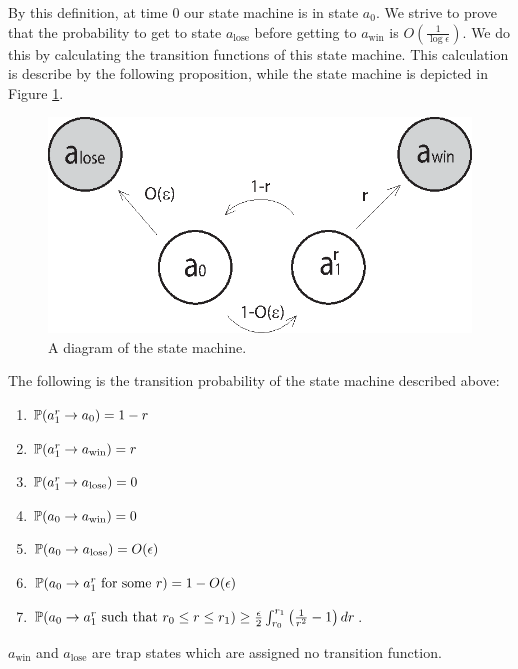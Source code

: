 {{By this definition, at time $0$ our state machine is in state $a_0$.
We strive to prove that the probability to get to
 state $a_\text{lose}$ before getting to $a_\text{win}$ is $O(\frac1{\log\epsilon})$.
 We do this by calculating the transition functions of
 this state machine. This calculation is describe by the following proposition,
 while the state machine is depicted in Figure \ref{fig:state_machine}.

 \begin{figure}[htb]
\begin{center}
\leavevmode
\includegraphics{state_machine.eps}
\end{center}
\caption{A diagram of the state machine.}
\label{fig:state_machine}
\end{figure}

\begin{propos}\label{prop:trans}
The following is the transition probability of the state machine described above:
\begin{enumerate}
\item\label{m11} $\P(a^r_1\rightarrow a_0)=1-r$
\item\label{m12} $\P(a^r_1\rightarrow a_\text{win})=r$
\item\label{m13} $\P(a^r_1\rightarrow a_\text{lose})=0$
\item\label{m21} $\P(a_0\rightarrow a_\text{win})=0$
\item\label{m22} $\P(a_0\rightarrow a_\text{lose})=O(\epsilon)$
\item\label{m23} $\P(a_0\rightarrow a^r_1 \text{ for some }r)=1-O(\epsilon)$
\item\label{m24} $\P(a_0\rightarrow a^r_1 \text{ such that } r_0 \le r \le r_1) \ge \frac{\epsilon}{2} \int_{r_0}^{r_1} \left(\frac{1}{r^2}-1\right) dr$.
\end{enumerate}
$a_\text{win}$ and $a_\text{lose}$ are trap states which are assigned no transition function.
\end{propos}

}}
